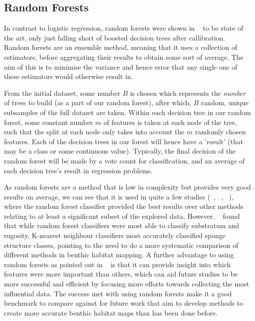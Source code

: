 \subsection{Random Forests}
In contrast to logistic regression, random forests were shown in ~\citet{caruana06} to be state of the art, only just falling short of boosted decision trees after callibration. Random forests are an ensemble method, meaning that it uses a collection of estimators, before aggregating their results to obtain some sort of average. The aim of this is to minimise the variance and hence error that any single one of these estimators would otherwise result in. 

From the initial dataset, some number $B$ is chosen which represents the \textit{number} of trees to build (as a part of our random forest), after which, $B$ random, unique subsamples of the full dataset are taken. Within each decision tree in our random forest, some constant number $m$ of features is taken at each node of the tree, such that the split at each node only takes into account the $m$ randomly chosen features. Each of the decision trees in our forest will hence have a 'result' (that may be a class or some continuous value). Typically, the final decision of the random forest will be made by a vote count for classification, and an average of each decision tree's result in regression problems.

As random forests are a method that is low in complexity but provides very good results on average, we can see that it is used in quite a few studies (~\citet{lucieer13}, ~\citet{seiler12}, ~\citet{hasan14}), where the random forest classifier provided the best results over other methods relating to at least a significant subset of the explored data. However, ~\citet{lucieer13} found that while random forest classifiers were most able to classify substratum and rugosity, K-nearest neighbour classifiers most accurately classified sponge structure classes, pointing to the need to do a more systematic comparison of different methods in benthic habitat mapping. A further advantage to using random forests as pointed out in ~\citep{hasan14} is that it can provide insight into which features were more important than others, which can aid future studies to be more successful and efficient by focusing more efforts towards collecting the most influential data. The success met with using random forests make it a good benchmark to compare against for future work that aim to develop methods to create more accurate benthic habitat maps than has been done before.


